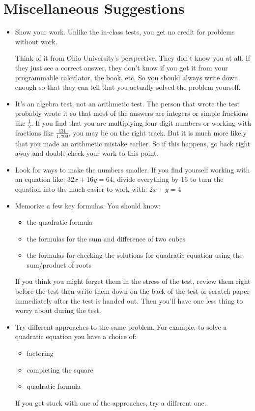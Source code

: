\documentclass{article}
\begin{document}
\section{Miscellaneous Suggestions}
\begin{itemize}

\item
Show your work.  Unlike the in-class tests, you get no credit for problems without work.  

Think of it from Ohio University's perspective.  They don't know you at all.  If they just see a correct answer, they
don't know if you got it from your programmable calculator, the book, etc.  So you should always write down enough so
that they can tell that you actually solved the problem yourself.

\item
It's an algebra test, not an arithmetic test.  The person that wrote the test probably wrote it so that most of the
answers are integers or simple fractions like $\frac{1}{2}$.  If you find that you are multiplying four digit numbers or working with
fractions like $\frac{131}{1,709}$, you may be on the right track.  But it is much more likely that you made an
arithmetic mistake earlier.  So if this happens, go back right away and double check your work to this point.

\item
Look for ways to make the numbers smaller.  If you find yourself working with an equation like:  $32x + 16y = 64$,
divide everything by $16$ to turn the equation into the much easier to work with: $2x + y = 4$

\item 
Memorize a few key formulas.  You should know:
\begin{itemize}
  \item the quadratic formula
  \item the formulas for the sum and difference of two cubes
  \item the formulas for checking the solutions for quadratic equation using the sum/product of roots
\end{itemize}

If you think you might forget them in the stress of the test, review them right before the test then write them down on
the back of the test or scratch paper immediately after the test is handed out.  Then you'll have one less thing to
worry about during the test.

\item
Try different approaches to the same problem.  For example, to solve a quadratic equation you have a choice of:
\begin{itemize}
  \item factoring
  \item completing the square
  \item quadratic formula
\end{itemize}

If you get stuck with one of the approaches, try a different one.



\end{itemize}
\end{document}
